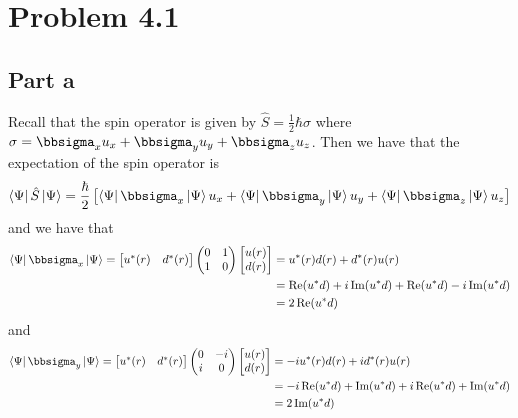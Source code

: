 \documentclass[12pt]{report}
\theoremstyle{custom}
\begin{document}
\maketitle

\section*{Problem 4.1}
\subsection*{Part a}
Recall that the spin operator is given by $\hat{S} = \frac{1}{2} \hbar \sigma$ where $\sigma = \bbsigma_x u_x + \bbsigma_y u_y + \bbsigma_z u_z$. Then we have that the expectation of the spin operator is
\begin{align*}
  \bra{\Psi}\hat{S} \ket{\Psi} = \frac{\hbar}{2}\left[\bra{\Psi}\bbsigma_x\ket{\Psi} u_x +\bra{\Psi}\bbsigma_y\ket{\Psi}u_y + \bra{\Psi}\bbsigma_z\ket{\Psi} u_z  \right]
\end{align*}
and we have that
\begin{align*}
  \bra{\Psi} \bbsigma_x \ket{\Psi} = \begin{bmatrix}u^*(r) &  d^*(r)\end{bmatrix} \begin{pmatrix}0 & 1 \\ 1 & 0 \end{pmatrix} \begin{bmatrix} u(r) \\ d(r) \end{bmatrix} &= u^*(r)d(r) + d^*(r)u(r) \\
                                                           &= \Re(u^*d) + i\Im(u^*d) + \Re(u^*d) - i\Im(u^*d) \\
                                                                      &= 2 \Re(u^*d)
\end{align*}
and
\begin{align*}
  \bra{\Psi} \bbsigma_y \ket{\Psi} = \begin{bmatrix}u^*(r) &  d^*(r)\end{bmatrix}\begin{pmatrix}0 & -i \\ i & 0 \end{pmatrix} \begin{bmatrix} u(r) \\ d(r) \end{bmatrix} &= -iu^*(r)d(r) + i d^*(r)u(r) \\ 
                                                           &= -i\Re(u^*d) + \Im(u^*d) + i \Re(u^*d) + \Im(u^*d) \\
                                                           &= 2 \Im(u^*d) 
\end{align*}
\end{document}

